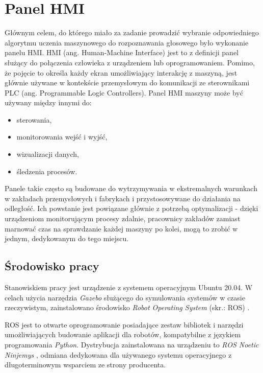 \chapter{Panel HMI}
\label{cha:panelHmi}

Głównym celem, do którego miało za zadanie prowadzić wybranie odpowiedniego algorytmu uczenia maszynowego do rozpoznawania głosowego było wykonanie panelu HMI. HMI (ang. Human-Machine Interface) jest to z definicji panel służący do połączenia człowieka z urządzeniem lub oprogramowaniem. Pomimo, że pojęcie to określa każdy ekran umożliwiający interakcję z maszyną, jest głównie używane w kontekście przemysłowym do komunikacji ze sterownikami PLC (ang. Programmable Logic Controllers). 
Panel HMI maszyny może być używany między innymi do:
\begin{itemize}
    \item sterowania,
    \item monitorowania wejść i wyjść,
    \item wizualizacji danych,
    \item śledzenia procesów.
\end{itemize}
Panele takie często są budowane do wytrzymywania w ekstremalnych warunkach w zakładach przemysłowych i fabrykach i przystosowywane do działania na odległość. Ich powstanie jest powiązane głównie z potrzebą optymalizacji - dzięki urządzeniom monitorującym procesy zdalnie, pracownicy zakładów zamiast marnować czas na sprawdzanie każdej maszyny po kolei, mogą to zrobić w jednym, dedykowanym do tego miejscu. 


\section{Środowisko pracy}
\label{sec:srodPrac}

Stanowiskiem pracy jest urządzenie z systemem operacyjnym Ubuntu 20.04. W celach użycia narzędzia \textit{Gazebo} \cite{gazebo} służącego do symulowania systemów w czasie rzeczywistym, zainstalowano środowisko \textit{Robot Operating System} (skr.: ROS) \cite{ros}. 

ROS \cite{ros} jest to otwarte oprogramowanie posiadające zestaw bibliotek i narzędzi umożliwiających budowanie aplikacji dla robotów, kompatybilne z językiem programowania \textit{Python}. Dystrybucja zainstalowana na urządzeniu to \textit{ROS Noetic Ninjemys} \cite{noetic}, odmiana dedykowana dla używanego systemu operacyjnego z długoterminowym wsparciem ze strony producenta. 

